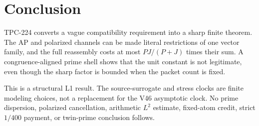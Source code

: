 \documentclass[11pt]{article}
\theoremstyle{remark}
\begin{document}
\section{Conclusion}

TPC-224 converts a vague compatibility requirement into a sharp finite theorem.
The AP and polarized channels can be made literal restrictions of one vector
family, and the full reassembly costs at most $PJ/(P+J)$ times their sum.  A
congruence-aligned prime shell shows that the unit constant is not legitimate,
even though the sharp factor is bounded when the packet count is fixed.

This is a structural L1 result.  The source-surrogate and stress clocks are
finite modeling choices, not a replacement for the V46 asymptotic clock.  No
prime dispersion, polarized cancellation, arithmetic $L^2$ estimate,
fixed-atom credit, strict $1/400$ payment, or twin-prime conclusion follows.



\end{document}
